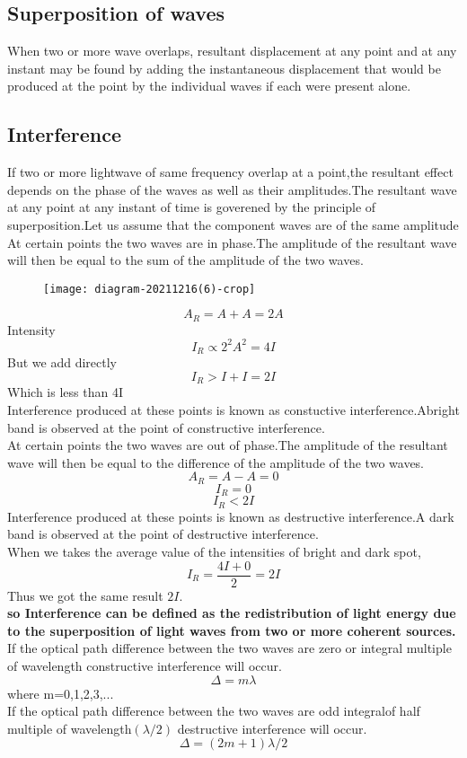 \subsection{Superposition of waves}
When two or more wave overlaps, resultant displacement at any point and at any instant may be found by adding the instantaneous displacement that would be produced at the point by the individual waves if each were present alone.
\subsection{Interference}
If two or more lightwave of same frequency overlap at a point,the resultant effect depends on the phase of the waves as well as their amplitudes.The resultant wave at any point at any instant of time is goverened by the principle of superposition.Let us assume that the component waves are of the same amplitude\\
At certain points the two waves are in phase.The amplitude of the resultant wave will then be equal to the sum of the amplitude of the two waves.\\
\begin{figure}[H]
	\centering
	\texttt{[image: diagram-20211216(6)-crop]}
	\caption{}
	\label{}
\end{figure}
$$A_R=A+A=2A$$
Intensity $$I_R\propto 2^2A^2=4I$$
But we add directly $$I_R>I+I=2I$$
Which is less than 4I\\
Interference produced at these points is known as constuctive interference.Abright band is observed at the point of constructive interference.\\
At certain points the two waves are out of phase.The amplitude of the resultant wave will then be equal to the difference of the amplitude of the two waves.\\
$$A_R=A-A=0$$
$$I_R=0$$
$$I_R<2I$$
Interference produced at these points is known as destructive interference.A dark band is observed at the point of destructive  interference.\\
When we takes the average value of the intensities of bright and dark spot,\\
$$I_R=\frac{4I+0}{2}=2I$$ Thus we got the same result $2I$.\\
\textbf{so Interference can be defined as the redistribution of light energy due to the superposition of light waves from two or more coherent sources.}\\
If the optical path difference between the two waves are zero or integral multiple of wavelength constructive interference will occur.\\
$$\Delta=m\lambda$$ where m=0,1,2,3,...\\
If the optical path difference between the two waves are odd integralof half multiple of wavelength$(\lambda/2)$ destructive interference will occur.\\
$$\Delta =(2m+1)\lambda/2$$
